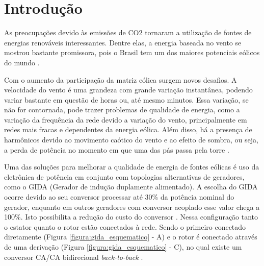 


\makeindex
\makeglossary




	\chapter{Introdução}
	\setcounter{page}{1}
	
	As preocupações devido às emissões de CO2 tornaram a utilização de fontes de energias renováveis interessantes. Dentre elas, a energia baseada no vento se mostrou bastante promissora, pois o Brasil tem um dos maiores potenciais eólicos do mundo \cite{atlaseolico}.
	
	Com o aumento da participação da matriz eólica surgem novos desafios. A velocidade do vento é uma grandeza com grande variação instantânea, podendo variar bastante em questão de horas ou, até mesmo minutos. Essa variação, se não for contornada, pode trazer problemas de qualidade de energia, como a variação da frequência da rede devido a variação do vento, principalmente em redes mais fracas e dependentes da energia eólica. Além disso, há a presença de harmônicos devido ao movimento caótico do vento e ao efeito de sombra, ou seja, a perda de potência no momento em que uma das pás passa pela torre \cite{pintofundamentos}.
	
	Uma das soluções para melhorar a qualidade de energia de fontes eólicas é uso da eletrônica de potência em conjunto com topologias alternativas de geradores, como o GIDA (Gerador de indução duplamente alimentado).  A escolha do GIDA ocorre devido ao seu conversor processar até 30\% da potência nominal do gerador, enquanto em outros geradores com conversor acoplado esse valor chega a 100\%. Isto possibilita a redução do custo do conversor \cite{dattacomparacao,simoesrenewableinduction}. Nessa configuração tanto o estator quanto o rotor estão conectados à rede. Sendo o primeiro conectado diretamente (Figura \ref{figura:gida_esquematico} - A) e o rotor  é conectado através de uma derivação (Figura \ref{figura:gida_esquematico} - C), no qual existe um conversor CA/CA bidirecional \emph{back-to-back} \cite{heliodfig}.
	
